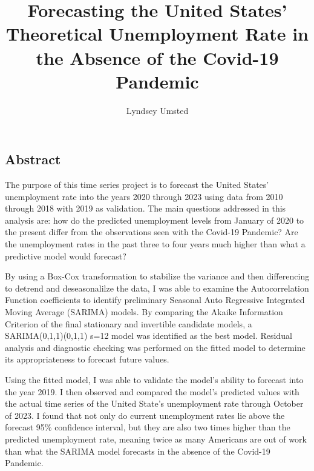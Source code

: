 \documentclass[
  letterpaper,
  DIV=11,
  numbers=noendperiod]{scrartcl}
\title{Forecasting the United States' Theoretical Unemployment Rate in
the Absence of the Covid-19 Pandemic}
\author{Lyndsey Umsted}
\date{}
\renewcommand*\contentsname{Table of contents}
\newcommand\contentsname{Table of contents}
\begin{document}
\maketitle
\ifdefined\Shaded\renewenvironment{Shaded}{\begin{tcolorbox}[breakable, borderline west={3pt}{0pt}{shadecolor}, sharp corners, boxrule=0pt, frame hidden, enhanced, interior hidden]}{\end{tcolorbox}}\fi

\renewcommand*\contentsname{Table of contents}
{
\hypersetup{linkcolor=}
\setcounter{tocdepth}{3}
\tableofcontents
}
\hypertarget{abstract}{%
\subsection{Abstract}\label{abstract}}

The purpose of this time series project is to forecast the United
States' unemployment rate into the years 2020 through 2023 using data
from 2010 through 2018 with 2019 as validation. The main questions
addressed in this analysis are: how do the predicted unemployment levels
from January of 2020 to the present differ from the observations seen
with the Covid-19 Pandemic? Are the unemployment rates in the past three
to four years much higher than what a predictive model would forecast?

By using a Box-Cox transformation to stabilize the variance and then
differencing to detrend and deseasonalilze the data, I was able to
examine the Autocorrelation Function coefficients to identify
preliminary Seasonal Auto Regressive Integrated Moving Average (SARIMA)
models. By comparing the Akaike Information Criterion of the final
stationary and invertible candidate models, a SARIMA(0,1,1)(0,1,1) s=12
model was identified as the best model. Residual analysis and diagnostic
checking was performed on the fitted model to determine its
appropriateness to forecast future values.

Using the fitted model, I was able to validate the model's ability to
forecast into the year 2019. I then observed and compared the model's
predicted values with the actual time series of the United State's
unemployment rate through October of 2023. I found that not only do
current unemployment rates lie above the forecast 95\% confidence
interval, but they are also two times higher than the predicted
unemployment rate, meaning twice as many Americans are out of work than
what the SARIMA model forecasts in the absence of the Covid-19 Pandemic.
\end{document}
